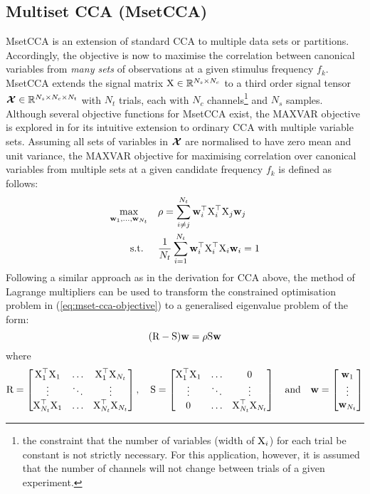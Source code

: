 \subsection{Multiset CCA (MsetCCA)}
MsetCCA is an extension of standard CCA to multiple data sets or partitions. Accordingly, the objective is now to maximise the correlation between canonical variables from \textit{many sets} of observations at a given stimulus frequency $f_k$. MsetCCA extends the signal matrix ${\textrm{X}}\in \mathbb{R}^{N_s \times N_c}$ to a third order signal tensor ${\bm{\mathcal{X}}} \in \mathbb{R}^{N_s \times N_c \times N_t}$ with $N_t$ trials, each with $N_c$ channels\footnote{the constraint that the number of variables (width of ${\textrm{X}}_i$) for each trial be constant is not strictly necessary. For this application, however, it is assumed that the number of channels will not change between trials of a given experiment.} and $N_s$ samples. Although several objective functions for MsetCCA exist, the MAXVAR objective is explored in \cite{zhang-mset-cca} for its intuitive extension to ordinary CCA with multiple variable sets. Assuming all sets of variables in ${\bm{\mathcal{X}}}$ are normalised to have zero mean and unit variance, the MAXVAR objective for maximising correlation over canonical variables from multiple sets at a given candidate frequency $f_k$ is defined as follows:
\begin{align}
\begin{split}
\max_{\mathbf{w}_{1}, \ldots, \mathbf{w}_{N_t}} & \quad \rho=\sum_{i \neq j}^{N_t} \mathbf{w}_{i}^\top{\textrm{X}}_{i}^\top {\textrm{X}}_{j}\mathbf{w}_{j} \\
\text { s.t. } & \quad \frac{1}{N_t} \sum_{i=1}^{N_t} \mathbf{w}_{i}^\top{\textrm{X}}_{i}^\top {\textrm{X}}_{i}\mathbf{w}_{i}=1
\end{split}
\label{eq:mset-cca-objective}
\end{align}
Following a similar approach as in the derivation for CCA above, the method of Lagrange multipliers can be used to transform the constrained optimisation problem in (\ref{eq:mset-cca-objective}) to a generalised eigenvalue problem of the form:
\begin{equation}
        ({\textrm{R}} -{\textrm{S}}){\mathbf{w}} = \rho{\textrm{S}} {\mathbf{w}}
\label{eq:mset-cca-gen-eig}
\end{equation}
where
\begin{align*}
{\textrm{R}} = \begin{bmatrix}
{\textrm{X}}_{1}^{\top}{\textrm{X}}_{1} & \ldots & {\textrm{X}}_{1}^{\top}{\textrm{X}}_{N_t} \\
\vdots & \ddots & \vdots \\
{\textrm{X}}_{N_t}^{\top}{\textrm{X}}_{1} & \ldots & {\textrm{X}}_{N_t}^{\top} {\textrm{X}}_{N_t}
\end{bmatrix},
\quad
{\textrm{S}} = \begin{bmatrix}
{\textrm{X}}_{1}^{\top}{\textrm{X}}_{1} & \ldots & 0 \\
\vdots & \ddots & \vdots \\
0 & \ldots & {\textrm{X}}_{N_t}^{\top} {\textrm{X}}_{N_t}
\end{bmatrix}
\quad
\textrm{and}
\quad
{\mathbf{w}} = \begin{bmatrix}
{\mathbf{w}}_1 \\ \vdots \\ {\mathbf{w}}_{N_t}
\end{bmatrix}
\end{align*}
